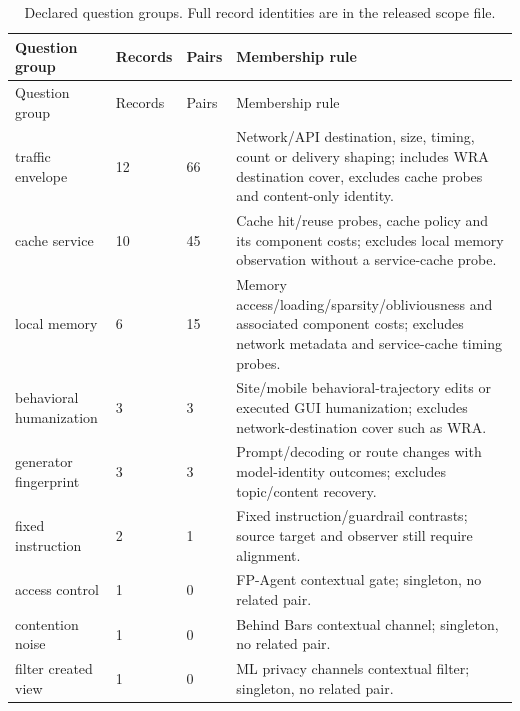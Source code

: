 \begin{longtable}{@{}p{}p{}p{}p{}@{}}
\caption{Declared question groups. Full record identities are in the released scope file.}\label{tab:r26-cohorts}\\
\toprule Question group & Records & Pairs & Membership rule\\\midrule\endfirsthead
\toprule Question group & Records & Pairs & Membership rule\\\midrule\endhead
\bottomrule\endfoot
traffic envelope & 12 & 66 & Network/API destination, size, timing, count or delivery shaping; includes WRA destination cover, excludes cache probes and content-only identity.\\
cache service & 10 & 45 & Cache hit/reuse probes, cache policy and its component costs; excludes local memory observation without a service-cache probe.\\
local memory & 6 & 15 & Memory access/loading/sparsity/obliviousness and associated component costs; excludes network metadata and service-cache timing probes.\\
behavioral humanization & 3 & 3 & Site/mobile behavioral-trajectory edits or executed GUI humanization; excludes network-destination cover such as WRA.\\
generator fingerprint & 3 & 3 & Prompt/decoding or route changes with model-identity outcomes; excludes topic/content recovery.\\
fixed instruction & 2 & 1 & Fixed instruction/guardrail contrasts; source target and observer still require alignment.\\
access control & 1 & 0 & FP-Agent contextual gate; singleton, no related pair.\\
contention noise & 1 & 0 & Behind Bars contextual channel; singleton, no related pair.\\
filter created view & 1 & 0 & ML privacy channels contextual filter; singleton, no related pair.\\
\end{longtable}

